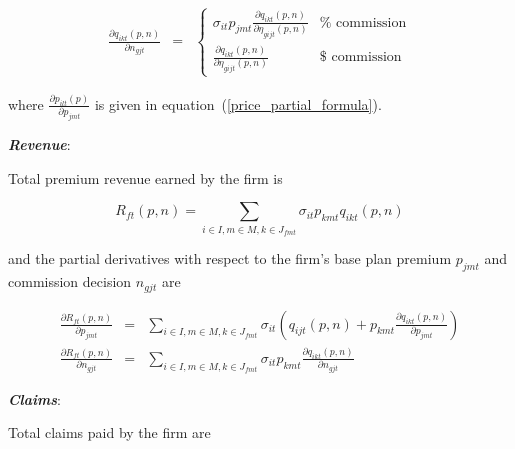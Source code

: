 \documentclass[12pt]{article}
\begin{document}
		 \begin{eqnarray*}
	\frac{\partial q_{ikt}(\textit{p},\textit{n})}{\partial n_{gjt}} &=& \begin{cases} 
		\sigma_{it} p_{jmt} \frac{\partial q_{ikt}(\textit{p},\textit{n})}{\partial \eta_{gijt}(\textit{p},\textit{n})}  & \mathrm{\% \,\, commission} \\		
		\frac{\partial q_{ikt}(\textit{p},\textit{n})}{\partial \eta_{gijt}(\textit{p},\textit{n})} & \mathrm{\$ \,\, commission}
   \end{cases}
	\end{eqnarray*}
				
		\doublespacing
				
		
	\noindent	where $\frac{\partial p_{ilt}(\textit{p})}{\partial p_{jmt}}$ is given in equation~(\ref{price_partial_formula}).
	
		
\noindent \textit{\bf Revenue}:
	
\noindent Total premium revenue earned by the firm is 		
	
		\vspace{-0.3in}		
	
		$$
		R_{ft}(\textit{p},\textit{n}) = \sum_{i \in I, m \in M, k \in J_{fmt}} \sigma_{it} p_{kmt} q_{ikt}(\textit{p},\textit{n})
		$$	
	
\noindent and the partial derivatives with respect to the firm's base plan premium $p_{jmt}$ and commission decision $n_{gjt}$ are 	
	
		\vspace{-0.4in}		
	
		\begin{eqnarray*}
		\frac{\partial R_{ft}(\textit{p},\textit{n})}{\partial p_{jmt}} &=&  \sum_{i \in I, m \in M, k \in J_{fmt}} \sigma_{it} \left(q_{ijt}(\textit{p},\textit{n}) + p_{kmt} \frac{\partial q_{ikt}(\textit{p},\textit{n})}{\partial p_{jmt}} \right) \\
		\frac{\partial R_{ft}(\textit{p},\textit{n})}{\partial n_{gjt}} &=& \sum_{i \in I, m \in M, k \in J_{fmt}} \sigma_{it} p_{kmt}  \frac{\partial q_{ikt}(\textit{p},\textit{n})}{\partial n_{gjt}} 
		\end{eqnarray*}

	\vspace{-0.1in}

\noindent \textit{\bf Claims}:
	
\noindent Total claims paid by the firm are 		
	
	\vspace{-0.3in}		
	
\end{document}
